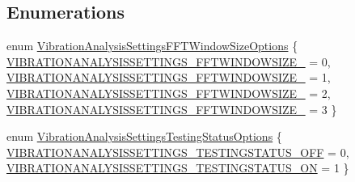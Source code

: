 \subsection*{\-Enumerations}
\begin{DoxyCompactItemize}
\item 
enum \hyperlink{group___vibration_analysis_settings_ga60caf653b6432a42f9ddd04e258db7b1}{\-Vibration\-Analysis\-Settings\-F\-F\-T\-Window\-Size\-Options} \{ \hyperlink{group___vibration_analysis_settings_gga60caf653b6432a42f9ddd04e258db7b1aeb1fb1ca17cf7da53b374f97785d115c}{\-V\-I\-B\-R\-A\-T\-I\-O\-N\-A\-N\-A\-L\-Y\-S\-I\-S\-S\-E\-T\-T\-I\-N\-G\-S\-\_\-\-F\-F\-T\-W\-I\-N\-D\-O\-W\-S\-I\-Z\-E\-\_} = 0, 
\hyperlink{group___vibration_analysis_settings_gga60caf653b6432a42f9ddd04e258db7b1a4bdeb173a6129c135e6478c6d327b74f}{\-V\-I\-B\-R\-A\-T\-I\-O\-N\-A\-N\-A\-L\-Y\-S\-I\-S\-S\-E\-T\-T\-I\-N\-G\-S\-\_\-\-F\-F\-T\-W\-I\-N\-D\-O\-W\-S\-I\-Z\-E\-\_} = 1, 
\hyperlink{group___vibration_analysis_settings_gga60caf653b6432a42f9ddd04e258db7b1acb204abb75385eda9d6bee597b5f4e69}{\-V\-I\-B\-R\-A\-T\-I\-O\-N\-A\-N\-A\-L\-Y\-S\-I\-S\-S\-E\-T\-T\-I\-N\-G\-S\-\_\-\-F\-F\-T\-W\-I\-N\-D\-O\-W\-S\-I\-Z\-E\-\_} = 2, 
\hyperlink{group___vibration_analysis_settings_gga60caf653b6432a42f9ddd04e258db7b1afc5ff9b146458b1d932f9062873b546f}{\-V\-I\-B\-R\-A\-T\-I\-O\-N\-A\-N\-A\-L\-Y\-S\-I\-S\-S\-E\-T\-T\-I\-N\-G\-S\-\_\-\-F\-F\-T\-W\-I\-N\-D\-O\-W\-S\-I\-Z\-E\-\_} = 3
 \}
\item 
enum \hyperlink{group___vibration_analysis_settings_ga3587692f7b02eebcf94a1860d713db89}{\-Vibration\-Analysis\-Settings\-Testing\-Status\-Options} \{ \hyperlink{group___vibration_analysis_settings_gga3587692f7b02eebcf94a1860d713db89aaeb9ce3b230ff1249bcecdfa3a8b17ef}{\-V\-I\-B\-R\-A\-T\-I\-O\-N\-A\-N\-A\-L\-Y\-S\-I\-S\-S\-E\-T\-T\-I\-N\-G\-S\-\_\-\-T\-E\-S\-T\-I\-N\-G\-S\-T\-A\-T\-U\-S\-\_\-\-O\-F\-F} = 0, 
\hyperlink{group___vibration_analysis_settings_gga3587692f7b02eebcf94a1860d713db89a85f8706f9c7e18867ab6f5a2acb5734b}{\-V\-I\-B\-R\-A\-T\-I\-O\-N\-A\-N\-A\-L\-Y\-S\-I\-S\-S\-E\-T\-T\-I\-N\-G\-S\-\_\-\-T\-E\-S\-T\-I\-N\-G\-S\-T\-A\-T\-U\-S\-\_\-\-O\-N} = 1
 \}
\end{DoxyCompactItemize}
